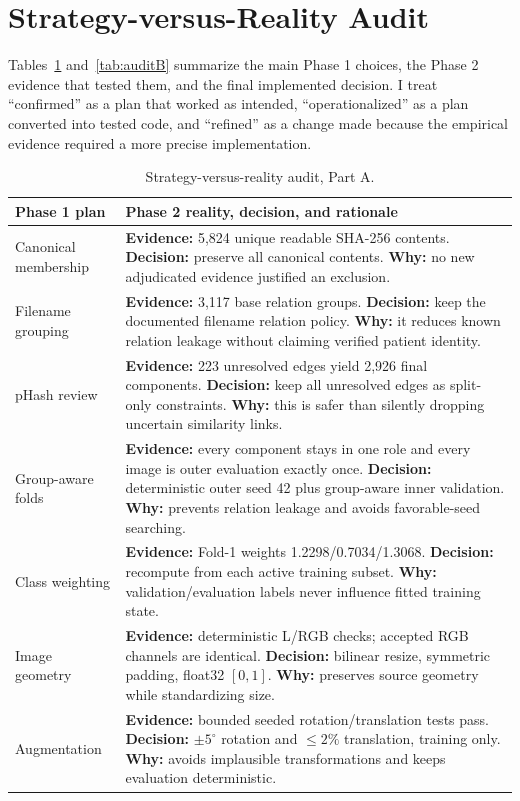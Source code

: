 \documentclass[conference]{IEEEtran}
\begin{document}
\section{Strategy-versus-Reality Audit}

Tables~\ref{tab:auditA} and~\ref{tab:auditB} summarize the main Phase 1 choices, the Phase 2 evidence that tested them, and the final implemented decision. I treat ``confirmed'' as a plan that worked as intended, ``operationalized'' as a plan converted into tested code, and ``refined'' as a change made because the empirical evidence required a more precise implementation.

\begin{table}[!t]
\caption{Strategy-versus-reality audit, Part A.}
\label{tab:auditA}
\centering
\footnotesize
\setlength{\tabcolsep}{2pt}
\begin{tabularx}{\columnwidth}{@{}p{}X@{}}
\toprule
Phase 1 plan & Phase 2 reality, decision, and rationale\\
\midrule
Canonical membership & \textbf{Evidence:} 5,824 unique readable SHA-256 contents. \textbf{Decision:} preserve all canonical contents. \textbf{Why:} no new adjudicated evidence justified an exclusion.\\
\addlinespace
Filename grouping & \textbf{Evidence:} 3,117 base relation groups. \textbf{Decision:} keep the documented filename relation policy. \textbf{Why:} it reduces known relation leakage without claiming verified patient identity.\\
\addlinespace
pHash review & \textbf{Evidence:} 223 unresolved edges yield 2,926 final components. \textbf{Decision:} keep all unresolved edges as split-only constraints. \textbf{Why:} this is safer than silently dropping uncertain similarity links.\\
\addlinespace
Group-aware folds & \textbf{Evidence:} every component stays in one role and every image is outer evaluation exactly once. \textbf{Decision:} deterministic outer seed 42 plus group-aware inner validation. \textbf{Why:} prevents relation leakage and avoids favorable-seed searching.\\
\addlinespace
Class weighting & \textbf{Evidence:} Fold-1 weights 1.2298/0.7034/1.3068. \textbf{Decision:} recompute from each active training subset. \textbf{Why:} validation/evaluation labels never influence fitted training state.\\
\addlinespace
Image geometry & \textbf{Evidence:} deterministic L/RGB checks; accepted RGB channels are identical. \textbf{Decision:} bilinear resize, symmetric padding, float32 $[0,1]$. \textbf{Why:} preserves source geometry while standardizing size.\\
\addlinespace
Augmentation & \textbf{Evidence:} bounded seeded rotation/translation tests pass. \textbf{Decision:} $\pm5^{\circ}$ rotation and $\leq2\%$ translation, training only. \textbf{Why:} avoids implausible transformations and keeps evaluation deterministic.\\
\bottomrule
\end{tabularx}
\end{table}
\end{document}
